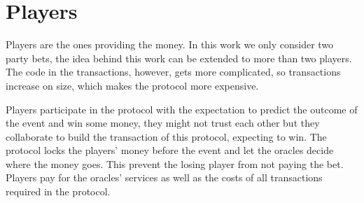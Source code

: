 \section{Players}

Players are the ones providing the money.
In this work we only consider two party bets, the idea behind this work can be
extended to more than two players.
The code in the transactions, however,  gets more complicated, so transactions
  increase on size, which makes the protocol more expensive.

Players participate in the protocol with the expectation to predict the
  outcome of the event and win some money, they might not trust each other but
  they collaborate to build the transaction of this protocol, expecting to win.
The protocol locks the players' money before the event and let the oracles
  decide where the money goes.
This prevent the losing player from not paying the bet.
Players pay for the oracles' services as well as the costs of all transactions
  required in the protocol.
